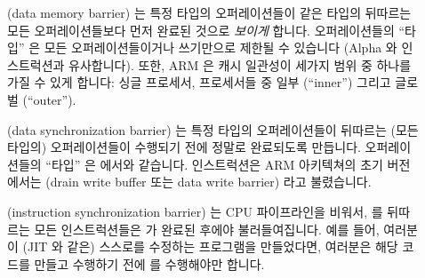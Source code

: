 \begin{description}
\item	[] (data memory barrier) 는 특정 타입의 오퍼레이션들이 같은
	타입의 뒤따르는 모든 오퍼레이션들보다 먼저 완료된 것으로 \emph{보이게}
	합니다.
	오퍼레이션들의 ``타입'' 은 모든 오퍼레이션들이거나 쓰기만으로 제한될 수
	있습니다 (Alpha  와 \Power{}  인스트럭션과
	유사합니다).
	또한, ARM 은 캐시 일관성이 세가지 범위 중 하나를 가질 수 있게 합니다:
	싱글 프로세서, 프로세서들 중 일부 (``inner'') 그리고 글로벌
	(``outer'').

\item	[] (data synchronization barrier) 는 특정 타입의
	오퍼레이션들이 뒤따르는 (모든 타입의) 오퍼레이션들이 수행되기 전에
	정말로 완료되도록 만듭니다.
	오퍼레이션들의 ``타입'' 은  에서와 같습니다.
	 인스트럭션은 ARM 아키텍쳐의 초기 버전에서는  (drain
	write buffer 또는 data write barrier) 라고 불렸습니다.
\item	[] (instruction synchronization barrier) 는 CPU 파이프라인을
	비워서,  를 뒤따르는 모든 인스트럭션들은  가 완료된
	후에야 불러들여집니다.
	예를 들어, 여러분이 (JIT 와 같은) 스스로를 수정하는 프로그램을
	만들었다면, 여러분은 해당 코드를 만들고 수행하기 전에  를
	수행해야만 합니다.

\end{description}

